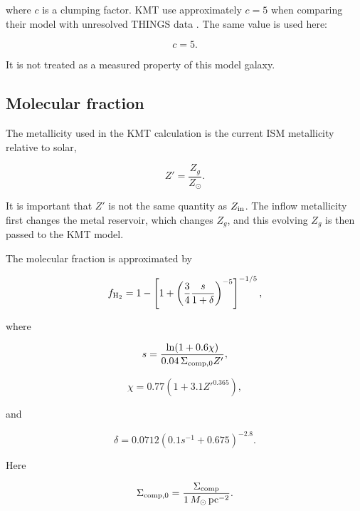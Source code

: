 \documentclass[10pt,a4paper]{article}
\begin{document}
where \(c\) is a clumping factor. KMT use approximately \(c=5\) when comparing their model with unresolved THINGS data \cite{kmt2009sf}. The same value is used here:

\begin{equation}
c=5.
\end{equation}

It is not treated as a measured property of this model galaxy.

\subsection{Molecular fraction}

The metallicity used in the KMT calculation is the current ISM metallicity relative to solar,

\begin{equation}
Z'=\frac{Z_g}{Z_\odot}.
\end{equation}

It is important that \(Z'\) is not the same quantity as \(Z_{\rm in}\). The inflow metallicity first changes the metal reservoir, which changes \(Z_g\), and this evolving \(Z_g\) is then passed to the KMT model.

The molecular fraction is approximated by \cite{kmt2009sf}

\begin{equation}
f_{\rm H_2}
=
1-
\left[
1+
\left(
\frac{3}{4}
\frac{s}{1+\delta}
\right)^{-5}
\right]^{-1/5},
\label{eq:fh2}
\end{equation}

where

\begin{equation}
s=
\frac{\ln(1+0.6\chi)}
{0.04\,\Sigma_{\rm comp,0}Z'},
\end{equation}

\begin{equation}
\chi
=
0.77
\left(
1+3.1Z'^{0.365}
\right),
\end{equation}

and

\begin{equation}
\delta
=
0.0712
\left(
0.1s^{-1}+0.675
\right)^{-2.8}.
\end{equation}

Here

\begin{equation}
\Sigma_{\rm comp,0}
=
\frac{\Sigma_{\rm comp}}
{1\,M_\odot\,{\rm pc}^{-2}}.
\end{equation}
\end{document}
